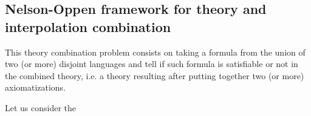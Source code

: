 \subsection{Nelson-Oppen framework for theory and interpolation
combination}

This theory combination problem consists on taking a 
formula from the union of two (or more) disjoint 
languages and tell if such formula is satisfiable
or not in the combined theory, i.e. a theory resulting
after putting together two (or more) axiomatizations.

\begin{example}
Let us consider the  
\end{example}

